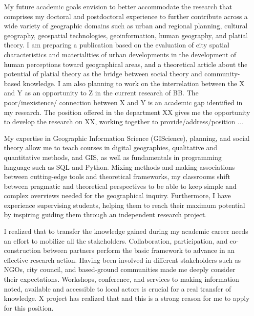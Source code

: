 My future academic goals envision to better accommodate the research that comprises my doctoral and postdoctoral experience to further contribute across a wide variety of geographic domains such as urban and regional planning, cultural geography, geospatial technologies, geoinformation, human geography, and platial theory. I am preparing a publication based on the evaluation of city spatial characteristics and materialities of urban developments in the development of human perceptions toward geographical areas, and a theoretical article about the potential of platial theory as the bridge between social theory and community-based knowledge. I am also planning to work on the interrelation between the X and Y as an opportunity to Z in the current research of BB. The poor/inexistence/ connection between X and Y is an academic gap identified in my research. The position offered in the department XX gives me the opportunity to develop the research on XX, working together to provide/address/position ... \par




My expertise in Geographic Information Science (GIScience), planning, and social theory allow me to teach courses in digital geographies, qualitative and quantitative methods, and GIS, as well as fundamentals in programming language such as SQL and Python. Mixing methods and making associations between cutting-edge tools and theoretical frameworks, my classrooms shift between pragmatic and theoretical perspectives to be able to keep simple and complex overviews needed for the geographical inquiry. Furthermore, I have experience supervising students, helping them to reach their maximum potential by inspiring guiding them through an independent research project.\par



I realized that to transfer the knowledge gained during my academic career needs an effort to mobilize all the stakeholders. Collaboration, participation, and co-construction between partners perform the basic framework to advance in an effective research-action. Having been involved in different stakeholders such as NGOs, city council, and based-ground communities made me deeply consider their expectations. Workshops, conference, and services to making information noted, available and accessible to local actors is crucial for a real transfer of knowledge. X project has realized that and this is a strong reason for me to apply for this position. 



